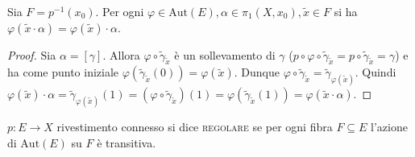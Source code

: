 \begin{thm}
  Sia $F=p^{-1}(x_0)$. Per ogni $\varphi \in \text{Aut}(E), \alpha \in \pi_1(X, x_0), \tilde{x} \in F$ si ha $\varphi(\tilde{x} \cdot \alpha)=\varphi(\tilde{x}) \cdot \alpha$.
\end{thm}

\begin{proof}
  Sia $\alpha=[\gamma]$.
  Allora $\varphi \circ \tilde{\gamma}_{\tilde{x}}$ è un sollevamento di $\gamma$ ($p \circ \varphi \circ \tilde{\gamma}_{\tilde{x}}=p \circ \tilde{\gamma}_{\tilde{x}}=\gamma$) e ha come punto iniziale $\varphi(\tilde{\gamma}_{\tilde{x}}(0))=\varphi(\tilde{x})$.
  Dunque $\varphi \circ \tilde{\gamma}_{\tilde{x}}=\tilde{\gamma}_{\varphi(\tilde{x})}$.
  Quindi $\varphi(\tilde{x}) \cdot \alpha=\tilde{\gamma}_{\varphi(\tilde{x})}(1)=(\varphi \circ \tilde{\gamma}_{\tilde{x}})(1)=\varphi(\tilde{\gamma}_{\tilde{x}}(1))=\varphi(\tilde{x} \cdot \alpha)$.
\end{proof}

\begin{defn}
  $p:E \rightarrow X$ rivestimento connesso si dice \textsc{regolare} se per ogni fibra $F \subseteq E$ l'azione di $\text{Aut}(E)$ su $F$ è transitiva.
\end{defn}
